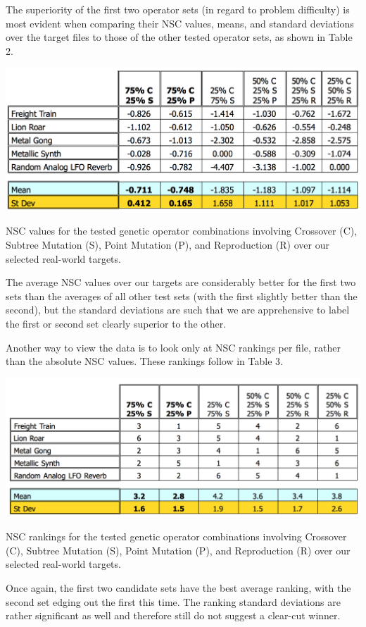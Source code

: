 \documentclass[12pt]{report} 	%
\numberwithin{figure}{chapter}
\numberwithin{table}{chapter}
\numberwithin{equation}{chapter}
\begin{document}
\begin{flushleft}
The superiority of the first two operator sets (in regard to problem difficulty) is most evident when comparing their NSC values, means, and standard deviations over the target files to those of the other tested operator sets, as shown in Table 2.
\begin{table}[h!]
\begin{center}
\includegraphics[scale=0.6,width=\linewidth]{GOPS_Table1}
\caption[NSC values for tested genetic operator combinations]{NSC values for the tested genetic operator combinations involving Crossover (C), Subtree Mutation (S), Point Mutation (P), and Reproduction (R) over our selected real-world targets.}
\end{center}
\end{table}

The average NSC values over our targets are considerably better for the first two sets than the averages of all other test sets (with the first slightly better than the second), but the standard deviations are such that we are apprehensive to label the first or second set clearly superior to the other.

Another way to view the data is to look only at NSC rankings per file, rather than the absolute NSC values. These rankings follow in Table 3.
\begin{table}[h!]
\begin{center}
\includegraphics[scale=0.6,width=\linewidth]{GOPS_Table2}
\caption[NSC rankings for tested genetic operator combinations]{NSC rankings for the tested genetic operator combinations involving Crossover (C), Subtree Mutation (S), Point Mutation (P), and Reproduction (R) over our selected real-world targets.}
\end{center}
\end{table}
Once again, the first two candidate sets have the best average ranking, with the second set edging out the first this time. The ranking standard deviations are rather significant as well and therefore still do not suggest a clear-cut winner. 


\end{flushleft}
\end{document}
